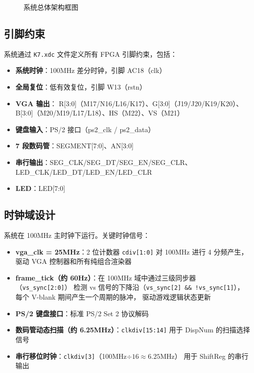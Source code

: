\documentclass[12pt,a4paper]{ctexart}
\begin{document}
\begin{figure}[H]
{%
}
\caption{系统总体架构框图}
\label{fig:arch}
\end{figure}

\subsection{引脚约束}

系统通过 \texttt{K7.xdc} 文件定义所有 FPGA 引脚约束，包括：
\begin{itemize}
    \item \textbf{系统时钟}：100MHz 差分时钟，引脚 AC18（clk）
    \item \textbf{全局复位}：低有效复位，引脚 W13（rstn）
    \item \textbf{VGA 输出}：
    R[3:0]（M17/N16/L16/K17）、G[3:0]（J19/J20/K19/K20）、B[3:0]（M20/M19/L17/L18）、HS（M22）、VS（M21）
    \item \textbf{键盘输入}：PS/2 接口（ps2\_clk / ps2\_data）
    \item \textbf{7 段数码管}：SEGMENT[7:0]、AN[3:0]
    \item \textbf{串行输出}：SEG\_CLK/SEG\_DT/SEG\_EN/SEG\_CLR、LED\_CLK/LED\_DT/LED\_EN/LED\_CLR
    \item \textbf{LED}：LED[7:0]
\end{itemize}

\subsection{时钟域设计}

系统在 100MHz 主时钟下运行。关键时钟信号：

\begin{itemize}
    \item \textbf{vga\_clk = 25MHz}：2 位计数器 \texttt{cdiv[1:0]} 对 100MHz 进行 4 分频产生，
    驱动 VGA 控制器和所有纯组合渲染器
    \item \textbf{frame\_tick（约 60Hz）}：在 100MHz 域中通过三级同步器（\texttt{vs\_sync[2:0]}）
    检测 vs 信号的下降沿（\texttt{vs\_sync[2] \&\& !vs\_sync[1]}），每个 V-blank 期间产生一个周期的脉冲，
    驱动游戏逻辑状态更新
    \item \textbf{PS/2 键盘接口}：标准 PS/2 Set 2 协议解码
    \item \textbf{数码管动态扫描（约 6.25MHz）}：\texttt{clkdiv[15:14]} 用于 DispNum 的扫描选择信号
    \item \textbf{串行移位时钟}：\texttt{clkdiv[3]}（100MHz$\div 16 \approx 6.25$MHz）
    用于 ShiftReg 的串行输出
\end{itemize}
\end{document}
